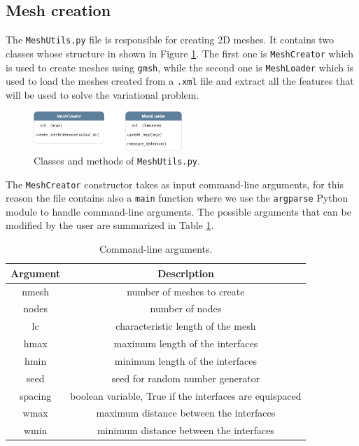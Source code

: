 \documentclass[11pt,a4paper]{article}
\begin{document}

\subsection{Mesh creation}

The \texttt{MeshUtils.py} file is responsible for creating 2D meshes. It contains two classes whose structure in shown in Figure \ref{mesh_class}. The first one is \texttt{MeshCreator} which is used to create meshes using \texttt{gmsh}, while the second one is  \texttt{MeshLoader} which is used to load the meshes created from a \texttt{.xml} file and extract all the features that will be used to solve the variational problem.

\begin{figure}[H]
    \centering
    \includegraphics[width=0.5\textwidth]{Images/mesh_class.png}
    \caption{Classes and methods of \texttt{MeshUtils.py}.}
    \label{mesh_class}
\end{figure}

The \texttt{MeshCreator} constructor takes as input command-line arguments, for this reason the file contains also a \texttt{main} function where we use the \texttt{argparse} Python module to handle command-line arguments. 
The possible arguments that can be modified by the user are summarized in Table \ref{args}.

\begin{table}[H]
    \centering
    \begin{tabular}{|c|c|}
        \hline
        \textbf{Argument} & \textbf{Description} \\
        \hline
        nmesh & number of meshes to create \\
        nodes & number of nodes \\
        lc & characteristic length of the mesh \\
        hmax & maximum length of the interfaces \\
        hmin & minimum length of the interfaces \\
        seed & seed for random number generator \\
        spacing & boolean variable, True if the interfaces are equispaced \\
        wmax & maximum distance between the interfaces \\
        wmin & minimum distance between the interfaces \\
        \hline   
    \end{tabular}
    \caption{Command-line arguments.}
    \label{args}
\end{table}
\end{document}
